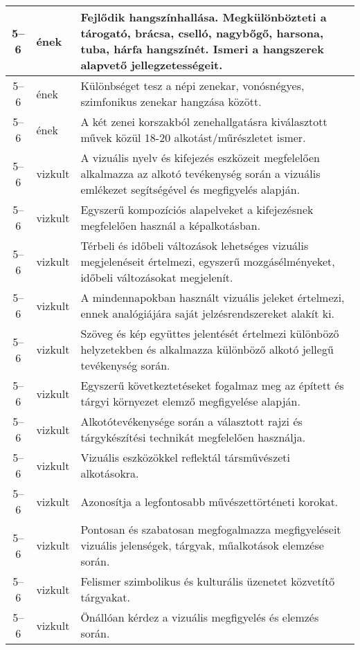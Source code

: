 \begin{small}
\begin{longtable}{c | p{2cm} |  p{11cm} }
              5--6 & ének & Fejlődik hangszínhallása. Megkülönbözteti a tárogató, brácsa, cselló, nagybőgő, harsona, tuba, hárfa hangszínét. Ismeri a hangszerek alapvető jellegzetességeit. \\ \hline
              5--6 & ének & Különbséget tesz a népi zenekar, vonósnégyes, szimfonikus zenekar hangzása között. \\ \hline
              5--6 & ének & A két zenei korszakból zenehallgatásra kiválasztott művek közül 18-20 alkotást/műrészletet ismer. \\ \hline
              5--6 & vizkult & A vizuális nyelv és kifejezés eszközeit megfelelően alkalmazza az alkotó tevékenység során a vizuális emlékezet segítségével és megfigyelés alapján. \\ \hline
              5--6 & vizkult & Egyszerű kompozíciós alapelveket a kifejezésnek megfelelően használ a képalkotásban. \\ \hline
              5--6 & vizkult & Térbeli és időbeli változások lehetséges vizuális megjelenéseit értelmezi, egyszerű mozgásélményeket, időbeli változásokat megjelenít. \\ \hline
              5--6 & vizkult & A mindennapokban használt vizuális jeleket értelmezi, ennek analógiájára saját jelzésrendszereket alakít ki. \\ \hline
              5--6 & vizkult & Szöveg és kép együttes jelentését értelmezi különböző helyzetekben és alkalmazza különböző alkotó jellegű tevékenység során. \\ \hline
              5--6 & vizkult & Egyszerű következtetéseket fogalmaz meg az épített és tárgyi környezet elemző megfigyelése alapján. \\ \hline
              5--6 & vizkult & Alkotótevékenysége során a választott rajzi és tárgykészítési technikát megfelelően használja. \\ \hline
              5--6 & vizkult & Vizuális eszközökkel reflektál társművészeti alkotásokra. \\ \hline
              5--6 & vizkult & Azonosítja a legfontosabb művészettörténeti korokat. \\ \hline
              5--6 & vizkult & Pontosan és szabatosan megfogalmazza megfigyeléseit vizuális jelenségek, tárgyak, műalkotások elemzése során. \\ \hline
              5--6 & vizkult & Felismer szimbolikus és kulturális üzenetet közvetítő tárgyakat. \\ \hline
              5--6 & vizkult & Önállóan kérdez a vizuális megfigyelés és elemzés során. \\ \hline

\end{longtable}
\end{small}
